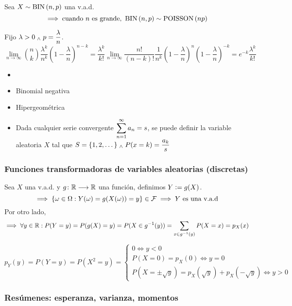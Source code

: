\begin{prop}
	Sea $X\sim \operatorname{BIN}\left(n, p\right)$ una v.a.d.
	\[\implies \text{cuando $n$ es grande, }\operatorname{BIN}\left(n, p\right)\sim\operatorname{POISSON}\left(np\right)\]
	\begin{dem}
		Fijo $\displaystyle\lambda>0 \; _{\wedge} \; p=\frac{\lambda}{n}$.
		\[\lim_{n\rightarrow\infty} \binom{n}{k}\frac{\lambda^k}{n^k}\left(1-\frac{\lambda}{n}\right)^{n-k}=\frac{\lambda^k}{k!}\lim_{n\rightarrow\infty} \frac{n!}{(n-k)!}\frac{1}{n^k}\left(1-\frac{\lambda}{n}\right)^n\left(1-\frac{\lambda}{n}\right)^{-k}=e^{-k}\frac{\lambda^k}{k!}\]
		
	\end{dem}
\end{prop}

\begin{ejem}
	\begin{itemize}
		\item[] 
		\item Binomial negativa
		\item Hipergeométrica
		\item Dada cualquier serie convergente $\displaystyle \sum_{n=1}^\infty a_n = s$, se puede definir la variable aleatoria $X$ tal que $\displaystyle S=\{1, 2, \dots\} \; _{\wedge} \; P(x=k)=\frac{a_k}{s}$
	\end{itemize}
\end{ejem}

\subsubsection{Funciones transformadoras de variables aleatorias (discretas)}
Sea $X$ una v.a.d. y $g \colon \mathbb{R} \longrightarrow \mathbb{R}$ una función, definimos $Y\vcentcolon= g(X)$.
\[\implies \{\omega \in\Omega:Y(\omega)=g(X(\omega))=y\} \in \mathcal{F} \implies Y\text{ es una v.a.d}\]
Por otro lado, 
\[\implies \forall y \in \mathbb{R}:P(Y=y)=P(g(X)=y)=P(X\in g^{-1}(y))=\sum_{x\in g^{-1}(y)}P(X=x)=p_X(x)\]

\begin{ejem}[$Y=x^2$]
	$$p_Y(y) = P(Y=y)=P(X^2=y)=\begin{cases}
		0 \iff y <0 \\
		P(X=0)=p_X(0) \iff y=0 \\
		P\left(X=\pm\sqrt{y}\right)=p_X\left(\sqrt{y}\right)+p_X\left(-\sqrt{y}\right) \iff y>0
	\end{cases}$$
\end{ejem}

\subsubsection{Resúmenes: esperanza, varianza, momentos}

